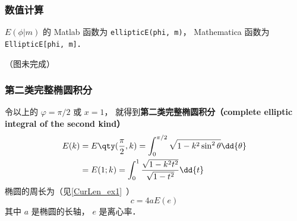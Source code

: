 \subsubsection{数值计算}
$E(\phi | m)$ 的 Matlab 函数为 \verb|ellipticE(phi, m)|， %
Mathematica 函数为 \verb|EllipticE[phi, m]|．

（图未完成）


\subsubsection{第二类完整椭圆积分}
令以上的 $\varphi = \pi/2$ 或 $x = 1$， 就得到\textbf{第二类完整椭圆积分（complete elliptic integral of the second kind）}
\begin{equation}
\begin{aligned}
E(k) &= E\qty(\frac{\pi}{2}, k) = \int_0^{\pi/2} \sqrt{1 - k^2\sin^2\theta} \dd{\theta}\\
&= E(1; k) =  \int_0^1 \frac{\sqrt{1 - k^2 t^2}}{\sqrt{1 - t^2}} \dd{t}
\end{aligned}
\end{equation}
椭圆的周长为（见\autoref{CurLen_ex1}~）
\begin{equation}
c = 4aE(e)
\end{equation}
其中 $a$ 是椭圆的长轴， $e$ 是离心率．
